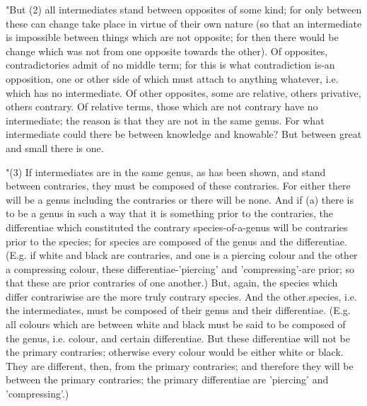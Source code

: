 "But (2) all intermediates stand between opposites of some kind; for
only between these can change take place in virtue of their own nature
(so that an intermediate is impossible between things which are not
opposite; for then there would be change which was not from one opposite
towards the other). Of opposites, contradictories admit of no middle
term; for this is what contradiction is-an opposition, one or other
side of which must attach to anything whatever, i.e. which has no
intermediate. Of other opposites, some are relative, others privative,
others contrary. Of relative terms, those which are not contrary have
no intermediate; the reason is that they are not in the same genus.
For what intermediate could there be between knowledge and knowable?
But between great and small there is one. 

"(3) If intermediates are in the same genus, as has been shown, and
stand between contraries, they must be composed of these contraries.
For either there will be a genus including the contraries or there
will be none. And if (a) there is to be a genus in such a way that
it is something prior to the contraries, the differentiae which constituted
the contrary species-of-a-genus will be contraries prior to the species;
for species are composed of the genus and the differentiae. (E.g.
if white and black are contraries, and one is a piercing colour and
the other a compressing colour, these differentiae-'piercing' and
'compressing'-are prior; so that these are prior contraries of one
another.) But, again, the species which differ contrariwise are the
more truly contrary species. And the other.species, i.e. the intermediates,
must be composed of their genus and their differentiae. (E.g. all
colours which are between white and black must be said to be composed
of the genus, i.e. colour, and certain differentiae. But these differentiae
will not be the primary contraries; otherwise every colour would be
either white or black. They are different, then, from the primary
contraries; and therefore they will be between the primary contraries;
the primary differentiae are 'piercing' and 'compressing'.)

